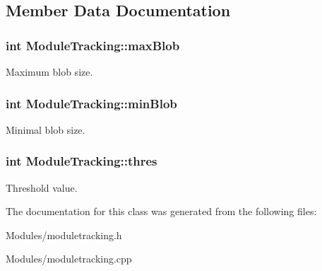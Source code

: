 \subsection{Member Data Documentation}
\hypertarget{class_module_tracking_a214f19885eabf872c8d0aae7e32d21fe}{
\subsubsection[{maxBlob}]{\setlength{\rightskip}{0pt plus 5cm}int {\bf ModuleTracking::maxBlob}}}
\label{da/d70/class_module_tracking_a214f19885eabf872c8d0aae7e32d21fe}
Maximum blob size. \hypertarget{class_module_tracking_a84154259850d20c01e5946278e8e770d}{
\subsubsection[{minBlob}]{\setlength{\rightskip}{0pt plus 5cm}int {\bf ModuleTracking::minBlob}}}
\label{da/d70/class_module_tracking_a84154259850d20c01e5946278e8e770d}
Minimal blob size. \hypertarget{class_module_tracking_ab164f7c4fe1cdf96e8b04508819d8a0c}{
\subsubsection[{thres}]{\setlength{\rightskip}{0pt plus 5cm}int {\bf ModuleTracking::thres}}}
\label{da/d70/class_module_tracking_ab164f7c4fe1cdf96e8b04508819d8a0c}
Threshold value. 

The documentation for this class was generated from the following files:\begin{DoxyCompactItemize}
\item 
Modules/moduletracking.h\item 
Modules/moduletracking.cpp\end{DoxyCompactItemize}
